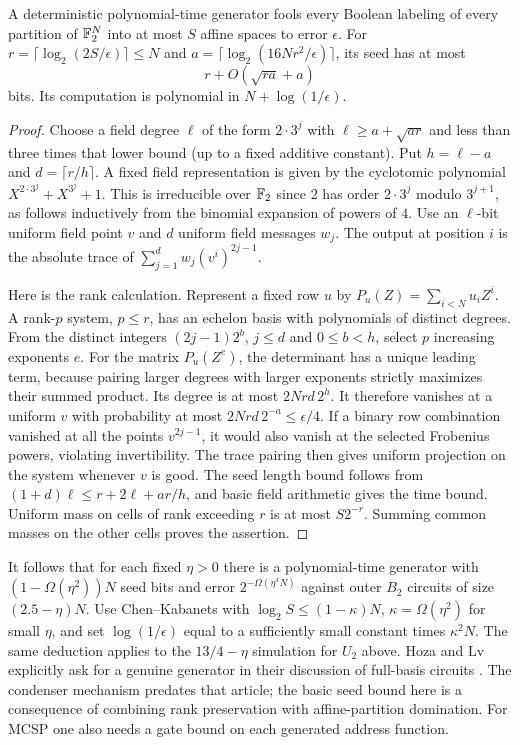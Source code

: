 \begin{lemma}\label{lem:generic}
A deterministic polynomial-time generator fools every Boolean labeling of every partition of $\mathbb F_2^N$ into at most $S$ affine spaces to error $\epsilon$. For $r=\lceil\log_2(2S/\epsilon)\rceil\le N$ and $a=\lceil\log_2(16Nr^2/\epsilon)\rceil$, its seed has at most
\[
                       r+O(\sqrt{ra}+a)
\]
bits. Its computation is polynomial in $N+\log(1/\epsilon)$.
\end{lemma}
\begin{proof}
Choose a field degree $\ell$ of the form $2\cdot 3^j$ with $\ell\ge a+\sqrt{ar}$ and less than three times that lower bound (up to a fixed additive constant). Put $h=\ell-a$ and $d=\lceil r/h\rceil$. A fixed field representation is given by the cyclotomic polynomial $X^{2\cdot3^j}+X^{3^j}+1$. This is irreducible over $\mathbb F_2$ since $2$ has order $2\cdot3^j$ modulo $3^{j+1}$, as follows inductively from the binomial expansion of powers of $4$. Use an $\ell$-bit uniform field point $v$ and $d$ uniform field messages $w_j$. The output at position $i$ is the absolute trace of $\sum_{j=1}^d w_j(v^i)^{2j-1}$.

Here is the rank calculation. Represent a fixed row $u$ by $P_u(Z)=\sum_{i<N}u_i Z^i$. A rank-$p$ system, $p\le r$, has an echelon basis with polynomials of distinct degrees. From the distinct integers $(2j-1)2^b$, $j\le d$ and $0\le b<h$, select $p$ increasing exponents $e$. For the matrix $P_u(Z^e)$, the determinant has a unique leading term, because pairing larger degrees with larger exponents strictly maximizes their summed product. Its degree is at most $2Nrd\,2^h$. It therefore vanishes at a uniform $v$ with probability at most $2Nrd\,2^{-a}\le\epsilon/4$. If a binary row combination vanished at all the points $v^{2j-1}$, it would also vanish at the selected Frobenius powers, violating invertibility. The trace pairing then gives uniform projection on the system whenever $v$ is good. The seed length bound follows from $(1+d)\ell\le r+2\ell+ar/h$, and basic field arithmetic gives the time bound. Uniform mass on cells of rank exceeding $r$ is at most $S2^{-r}$. Summing common masses on the other cells proves the assertion.
\end{proof}

It follows that for each fixed $\eta>0$ there is a polynomial-time generator with $(1-\Omega(\eta^2))N$ seed bits and error $2^{-\Omega(\eta^4 N)}$ against outer $B_2$ circuits of size $(2.5-\eta)N$. Use Chen--Kabanets with $\log_2 S\le(1-\kappa)N$, $\kappa=\Omega(\eta^2)$ for small $\eta$, and set $\log(1/\epsilon)$ equal to a sufficiently small constant times $\kappa^2 N$. The same deduction applies to the $13/4-\eta$ simulation for $U_2$ above. Hoza and Lv explicitly ask for a genuine generator in their discussion of full-basis circuits \cite[Section 1.4]{hl}. The condenser mechanism predates that article; the basic seed bound here is a consequence of combining rank preservation with affine-partition domination. For MCSP one also needs a gate bound on each generated address function.

